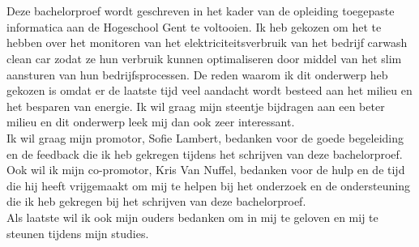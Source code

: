 
\chapter*{}%
\label{ch:voorwoord}


Deze bachelorproef wordt geschreven in het kader van de opleiding toegepaste informatica aan de Hogeschool Gent te voltooien. Ik heb gekozen om het te hebben over het monitoren van het elektriciteitsverbruik van het bedrijf carwash clean car zodat ze hun verbruik kunnen optimaliseren door middel van het slim aansturen van hun bedrijfsprocessen. De reden waarom ik dit onderwerp heb gekozen is omdat er de laatste tijd veel aandacht wordt besteed aan het milieu en het besparen van energie. Ik wil graag mijn steentje bijdragen aan een beter milieu en dit onderwerp leek mij dan ook zeer interessant.\\

Ik wil graag mijn promotor, Sofie Lambert, bedanken voor de goede begeleiding en de feedback die ik heb gekregen tijdens het schrijven van deze bachelorproef. Ook wil ik mijn co-promotor, Kris Van Nuffel, bedanken voor de hulp en de tijd die hij heeft vrijgemaakt om mij te helpen bij het onderzoek en de ondersteuning die ik heb gekregen bij het schrijven van deze bachelorproef.\\

Als laatste wil ik ook mijn ouders bedanken om in mij te geloven en mij te steunen tijdens mijn studies.